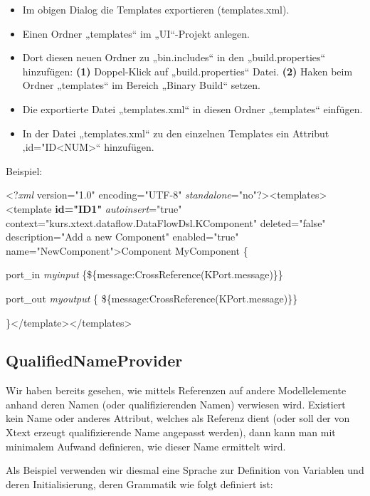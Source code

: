 \documentclass[a4]{article}
\providecommand{\tightlist}{%
  \setlength{\itemsep}{0pt}\setlength{\parskip}{0pt}}
\begin{document}
\begin{itemize}
\tightlist
\item
  Im obigen Dialog die Templates exportieren (templates.xml).
\item
  Einen Ordner „templates`` im „UI``-Projekt anlegen.
\item
  Dort diesen neuen Ordner zu „bin.includes`` in den „build.properties``
  hinzufügen: \textbf{(1) }Doppel-Klick auf „build.properties`` Datei.
  \textbf{(2) }Haken beim Ordner „templates`` im Bereich „Binary Build``
  setzen.
\item
  Die exportierte Datei „templates.xml`` in diesen Ordner „templates``
  einfügen.
\item
  In der Datei „templates.xml`` zu den einzelnen Templates ein Attribut
  ‚id="ID\textless{}NUM\textgreater{}`` hinzufügen. 
\end{itemize}

Beispiel:

\textless{}?\emph{xml} version="1.0" encoding="UTF-8"
\emph{standalone}="no"?\textgreater{}\textless{}templates\textgreater{}\textless{}template
\textbf{id="ID1"} \emph{autoinsert}="true"
context="kurs.xtext.dataflow.DataFlowDsl.KComponent" deleted="false"
description="Add a new Component" enabled="true"
name="NewComponent"\textgreater{}Component MyComponent \{

port\_in \emph{myinput} \{\$\{message:CrossReference(KPort.message)\}\}

port\_out \emph{myoutput} \{
\$\{message:CrossReference(KPort.message)\}\}

\}\textless{}/template\textgreater{}\textless{}/templates\textgreater{}

\subsection[QualifiedNameProvider]{\texorpdfstring{\protect\hypertarget{anchor-54}{}{}QualifiedNameProvider}{QualifiedNameProvider}}\label{qualifiednameprovider}

Wir haben bereits gesehen, wie mittels Referenzen auf andere
Modellelemente anhand deren Namen (oder qualifizierenden Namen)
verwiesen wird. Existiert kein Name oder anderes Attribut, welches als
Referenz dient (oder soll der von Xtext erzeugt qualifizierende Name
angepasst werden), dann kann man mit minimalem Aufwand definieren, wie
dieser Name ermittelt wird.

Als Beispiel verwenden wir diesmal eine Sprache zur Definition von
Variablen und deren Initialisierung, deren Grammatik wie folgt definiert
ist:
\end{document}
